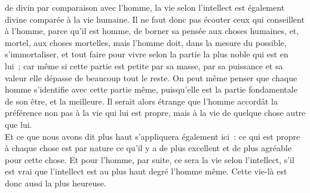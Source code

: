 \documentclass[french,twoside]{book} %
\begin{document}
de divin par comparaison avec l’homme, la vie selon l’intellect est également divine comparée à la vie humaine. Il ne faut donc pas écouter ceux qui conseillent à l’homme, parce qu’il est homme, de borner sa pensée aux choses humaines, et, mortel, aux choses mortelles, mais l’homme doit, dans la mesure du possible, s’immortaliser, et tout faire pour vivre selon la  partie la plus noble qui est en lui ; car même si cette partie est petite par sa masse, par sa puissance et sa valeur elle dépasse de beaucoup tout le reste. On peut même penser que chaque homme s’identifie avec cette partie même, puisqu’elle est la partie fondamentale de son être, et la meilleure. Il serait alors étrange que l’homme accordât la préférence non pas à la vie qui lui est propre, mais à la vie de quelque chose autre que lui. \\
Et ce que nous avons dit plus haut s’appliquera également ici : ce qui est propre à chaque chose est par nature ce qu’il y a de plus excellent et de plus agréable pour cette chose. Et pour l’homme, par suite, ce sera la vie selon l’intellect, s’il est vrai que l’intellect est au plus haut degré l’homme même. Cette vie-là est donc aussi la plus heureuse.
\end{document}
